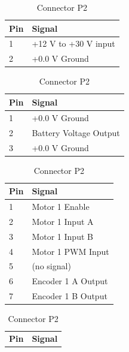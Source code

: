 \documentclass[11pt,a4paper]{article}
\begin{document}
  \begin{table}[h!]
    \flushleft
    \begin{minipage}{0.45\textwidth}
      \begin{tabular}[b]{|p{7mm}|p{4.5cm}|}
        \hline \textbf{Pin} & \textbf{Signal}\\
        \hline 1 & +12 V to +30 V input\\
        \hline 2 & +0.0 V Ground\\
        \hline
      \end{tabular}
      \caption{External Power Connector X8}
      \vspace{25pt}
    \end{minipage}\hfill
    \begin{minipage}{0.45\textwidth}
      \begin{tabular}[b]{|p{7mm}|p{4.5cm}|}
        \hline \textbf{Pin} & \textbf{Signal}\\
        \hline 1 & +0.0 V Ground\\
        \hline 2 & Battery Voltage Output\\
        \hline 3 & +0.0 V Ground\\
        \hline
      \end{tabular}
      \caption{External power Connector X9}
    \end{minipage}\hfill
    \begin{minipage}{0.45\textwidth}
      \begin{tabular}[b]{|p{7mm}|p{4.5cm}|}
        \hline \textbf{Pin} & \textbf{Signal}\\
        \hline 1 & Motor 1 Enable\\
        \hline 2 & Motor 1 Input A\\
        \hline 3 & Motor 1 Input B\\
        \hline 4 & Motor 1 PWM Input\\
        \hline 5 & (no signal)\\
        \hline 6 & Encoder 1 A Output\\
        \hline 7 & Encoder 1 B Output \\
        \hline
      \end{tabular}
      \caption{Connector P2}
      \vspace{25pt}
    \end{minipage}\hfill
    \begin{minipage}{0.45\textwidth}
      \begin{tabular}[b]{|p{7mm}|p{4.5cm}|}
        \hline \textbf{Pin} & \textbf{Signal}\\

\end{tabular}
\end{minipage}
\end{table}
\end{document}
